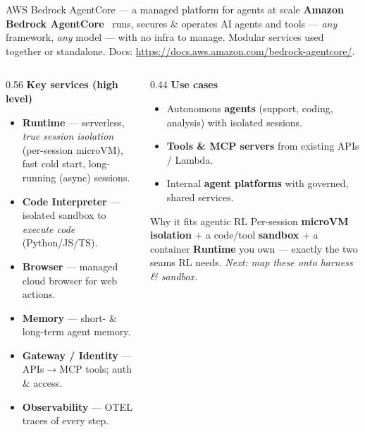 \documentclass[aspectratio=169]{beamer}
\begin{document}
\begin{frame}{AWS Bedrock AgentCore --- a managed platform for agents at scale}
  \footnotesize \textbf{Amazon Bedrock AgentCore}~\cite{ac-docs} runs, secures \& operates AI agents
  and tools --- \emph{any} framework, \emph{any} model --- with no infra to manage. Modular services
  used together or standalone. Docs: \url{https://docs.aws.amazon.com/bedrock-agentcore/}.
  \vspace{0.3em}
  \begin{columns}[T]
    \begin{column}{0.56\textwidth}
      \textbf{Key services (high level)}
      \begin{itemize}\setlength\itemsep{0.1em}
        \item \textbf{Runtime} --- serverless, \emph{true session isolation} (per-session microVM),
          fast cold start, long-running (async) sessions.
        \item \textbf{Code Interpreter} --- isolated sandbox to \emph{execute code} (Python/JS/TS).
        \item \textbf{Browser} --- managed cloud browser for web actions.
        \item \textbf{Memory} --- short- \& long-term agent memory.
        \item \textbf{Gateway / Identity} --- APIs$\to$MCP tools; auth \& access.
        \item \textbf{Observability} --- OTEL traces of every step.
      \end{itemize}
    \end{column}
    \begin{column}{0.44\textwidth}
      \textbf{Use cases}
      \begin{itemize}\setlength\itemsep{0.1em}
        \item Autonomous \textbf{agents} (support, coding, analysis) with isolated sessions.
        \item \textbf{Tools \& MCP servers} from existing APIs / Lambda.
        \item Internal \textbf{agent platforms} with governed, shared services.
      \end{itemize}
      \vspace{0.3em}
      \begin{block}{Why it fits agentic RL}
        \scriptsize Per-session \textbf{microVM isolation} + a code/tool \textbf{sandbox} + a container
        \textbf{Runtime} you own --- exactly the two seams RL needs. \emph{Next: map these onto harness \& sandbox.}
      \end{block}
    \end{column}
  \end{columns}
\end{frame}
\end{document}
